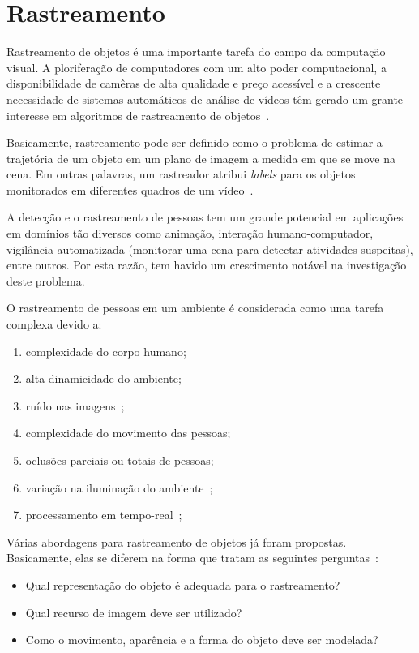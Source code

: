 \section {Rastreamento}	

	Rastreamento de objetos é uma importante tarefa do campo da computação visual. A ploriferação de computadores com um alto poder computacional, a disponibilidade de camêras de alta qualidade e preço acessível e a crescente necessidade de sistemas automáticos de análise de vídeos têm gerado um grante interesse em algoritmos de rastreamento de objetos~\cite{yilmaz}.

	Basicamente, rastreamento pode ser definido como o problema de estimar a trajetória de um objeto em um plano de imagem a medida em que se move na cena. Em outras palavras, um rastreador atribui \textit{labels} para os objetos monitorados em diferentes quadros de um vídeo~\cite{yilmaz}.

	A detecção e o rastreamento de pessoas tem um grande potencial em aplicações em domínios tão diversos como animação, interação humano-computador, vigilância automatizada (monitorar uma cena para detectar atividades suspeitas), entre outros. Por esta razão, tem havido um crescimento notável na investigação deste problema.

	O rastreamento de pessoas em um ambiente é considerada como uma tarefa complexa devido a:

		\begin{enumerate}
			\item complexidade do corpo humano;
			\item alta dinamicidade do ambiente;
			\item ruído nas imagens~\cite{yilmaz};
			\item complexidade do movimento das pessoas;
			\item oclusões parciais ou totais de pessoas;
			\item variação na iluminação do ambiente~\cite{yilmaz};
			\item processamento em tempo-real~\cite{yilmaz};
		\end{enumerate}

	Várias abordagens para rastreamento de objetos já foram propostas. Basicamente, elas se diferem na forma que tratam as seguintes perguntas~\cite{yilmaz}: 
		
		\begin{itemize}
			\item Qual representação do objeto é adequada para o rastreamento?
			\item Qual recurso de imagem deve ser utilizado?
			\item Como o movimento, aparência e a forma do objeto deve ser modelada? 
		\end{itemize}

